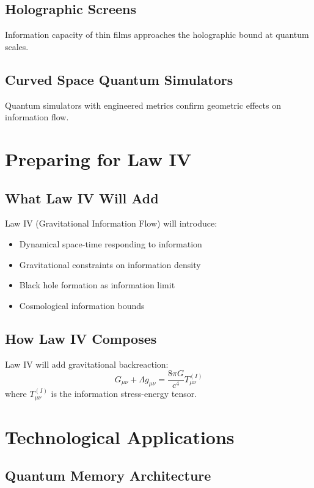 \documentclass[11pt,a4paper]{article}
\theoremstyle{definition}
\begin{document}
\subsection{Holographic Screens}
Information capacity of thin films approaches the holographic bound at quantum scales.

\subsection{Curved Space Quantum Simulators}
Quantum simulators with engineered metrics confirm geometric effects on information flow.

\section{Preparing for Law IV}

\subsection{What Law IV Will Add}

Law IV (Gravitational Information Flow) will introduce:
\begin{itemize}
\item Dynamical space-time responding to information
\item Gravitational constraints on information density
\item Black hole formation as information limit
\item Cosmological information bounds
\end{itemize}

\subsection{How Law IV Composes}

Law IV will add gravitational backreaction:
\begin{equation}
G_{\mu\nu} + \Lambda g_{\mu\nu} = \frac{8\pi G}{c^4} T^{(I)}_{\mu\nu}
\end{equation}
where $T^{(I)}_{\mu\nu}$ is the information stress-energy tensor.

\section{Technological Applications}

\subsection{Quantum Memory Architecture}
\end{document}
